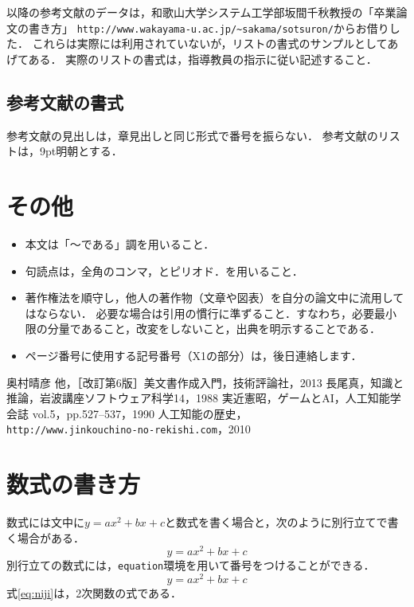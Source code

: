 \documentclass[twocolumn,fleqn]{jsarticle}
\begin{document}
\cite{長尾}以降の参考文献のデータは，和歌山大学システム工学部坂間千秋教授の「卒業論文の書き方」
{\small\verb|http://www.wakayama-u.ac.jp/~sakama/sotsuron/|}からお借りした．
これらは実際には利用されていないが，リストの書式のサンプルとしてあげてある．
実際のリストの書式は，指導教員の指示に従い記述すること．

\subsection{参考文献の書式}
参考文献の見出しは，章見出しと同じ形式で番号を振らない．
参考文献のリストは，9pt明朝とする．

\section{その他}
\begin{itemize}
\item 本文は「～である」調を用いること．
\item 句読点は，全角のコンマ，とピリオド．を用いること．
\item 著作権法を順守し，他人の著作物（文章や図表）を自分の論文中に流用してはならない．
必要な場合は引用の慣行に準ずること．すなわち，必要最小限の分量であること，改変をしないこと，出典を明示することである．
\item ページ番号に使用する記号番号（X1の部分）は，後日連絡します．
\end{itemize}

\begin{thebibliography}{9}\small
{} 奥村晴彦 他，［改訂第6版］\LaTeXe{}美文書作成入門，技術評論社，2013
 長尾真，知識と推論，岩波講座ソフトウェア科学14，1988
 実近憲昭，ゲームとAI，人工知能学会誌 vol.5，pp.527--537，1990
 人工知能の歴史，\\\verb|http://www.jinkouchino-no-rekishi.com|，2010
\end{thebibliography}

\section{数式の書き方}
数式には文中に$y=ax^2+bx+c$と数式を書く場合と，次のように別行立てで書く場合がある．
\[y=ax^2+bx+c\]
別行立ての数式には，\verb|equation|環境を用いて番号をつけることができる．
\begin{equation}
y=ax^2+bx+c
\label{eq:niji}
\end{equation}
式\ref{eq:niji}は，2次関数の式である．
\end{document}
